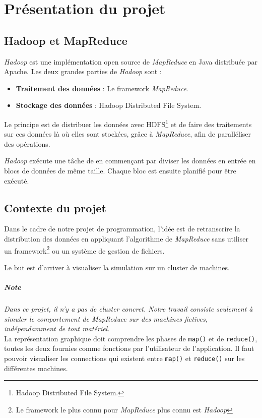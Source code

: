 \chapter{Présentation du projet}

\section{Hadoop et MapReduce}
{\it Hadoop}\cite{HadoopMapReduce} est une implémentation open source de {\it MapReduce} en Java distribuée par Apache.
 Les deux grandes parties de {\it Hadoop} sont :
\begin{itemize}
	\item {\bf Traitement des données} : Le framework {\it MapReduce}.
  	\item {\bf Stockage des données} : Hadoop Distributed File System. 
 \end{itemize}
 Le principe est de distribuer les données avec HDFS\footnote{Hadoop Distributed File System.} et de faire des traitements sur ces données là où elles sont stockées, grâce à {\it MapReduce}, afin de paralléliser des opérations.

{\it Hadoop} exécute une tâche de en commençant par diviser les données en entrée en blocs de données de même taille. Chaque bloc est ensuite planifié pour être exécuté.

\section{Contexte du projet}

Dans le cadre de notre projet de programmation, l'idée est de retranscrire la distribution des données en appliquant l'algorithme de {\it MapReduce} sans utiliser un framework\footnote{Le framework le plus connu pour {\it MapReduce} plus connu est {\it Hadoop}} ou un système de gestion de fichiers.

Le but est d'arriver à visualiser la simulation sur un cluster de machines.

\paragraph{Note}{\it Dans ce projet, il n'y a pas de cluster concret. Notre travail consiste seulement à simuler le comportement de {\it MapReduce} sur des machines fictives, indépendamment de tout matériel.}\\

La représentation graphique doit comprendre les phases de {\tt map()} et de {\tt reduce()}, toutes les deux fournies comme fonctions par l'utilisateur de l'application. Il faut pouvoir visualiser les connections qui existent entre {\tt map()} et {\tt reduce()} sur les différentes machines.\\

